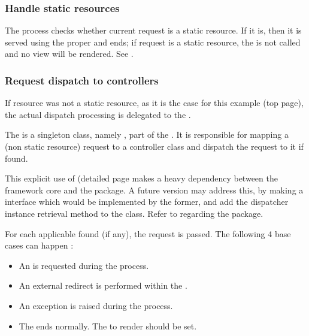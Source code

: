 \documentclass[pdftex,12pt,a4paper]{article}
\begin{document}
\subsubsection{Handle static resources}

The process checks whether current request is a static resource. If it is, then it is served using the proper  and ends; \ie if request is a static resource, the  is not called and no view will be rendered. See .

\subsubsection{Request dispatch to controllers}

If resource was not a static resource, as it is the case for this example (top page), the actual dispatch processing is delegated to the .

The  is a singleton class, namely , part of the . It is responsible for mapping a (non static resource) request to a controller class and dispatch the request to it if found.
\begin{note}
	This explicit use of  (detailed page \pageref{sec:frontdispatcher-dispatch-request} makes a heavy dependency between the framework core and the  package. A future version may address this, by making a  interface which would be implemented by the former, and add the dispatcher instance retrieval method to the  class. Refer to  regarding the  package.
\end{note}

For each applicable  found (if any), the request is passed. The following 4 base cases can happen :
\begin{itemize}
	\item An  is requested during the  process.
	\item An external redirect is performed within the .
	\item An exception is raised during the  process.
	\item The  ends normally. The  to render should be set.
\end{itemize}
\end{document}
